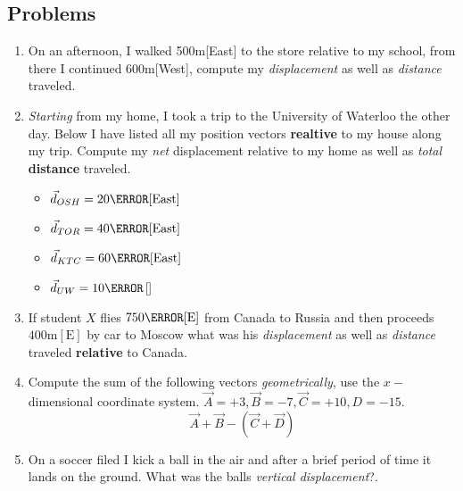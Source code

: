 \documentclass[12pt]{article}
\newcommand{\tx}[1]{\text{#1}}
\theoremstyle{break}
\begin{document}
\subsection{Problems}
\begin{enumerate}
    \item On an afternoon, I walked 500m[East] to the store relative to my school, from there I continued
        600m[West], compute my \emph{displacement} as well as \emph{distance} traveled.
        \vspace*{4cm}
    \item \emph{Starting} from my home, I took a trip to the University of Waterloo the other day. Below I have listed all my position vectors 
            \textbf{realtive} to my house along my trip. Compute my \emph{net} displacement relative to my home as well as \emph{total} \textbf{distance} traveled.
        \begin{itemize}
            \item $\vec d_{OSH}= 20\km[\tx{East}]$
            \item $\vec d_{TOR} = 40\km[\tx{East}]$
            \item $\vec d_{KTC} = 60\km[\tx{East}]$
            \item $\vec d_{UW} = 10\m $[\tx{West}]
        \end{itemize}
        \vspace*{5cm}
    \item If student $X$ flies $750\km[\tx{E}]$ from Canada to Russia and then proceeds $400\tx{m}[\tx{E}]$ by car
        to Moscow what was his \emph{displacement} as well as \emph{distance} traveled \textbf{relative} to Canada.
        \vspace*{4cm}

    \item Compute the sum of the following vectors \emph{geometrically}, use the $x-$dimensional coordinate system. $\vec A = +3, \vec B = -7, \vec C = +10, D = -15$. $$\vec A + \vec B - (\vec C + \vec D)$$
    \newpage 
    \item On a soccer filed I kick a ball in the air and after a brief period of time it lands on
        the ground. What was the balls \emph{vertical displacement}?.
\end{enumerate}
\end{document}
